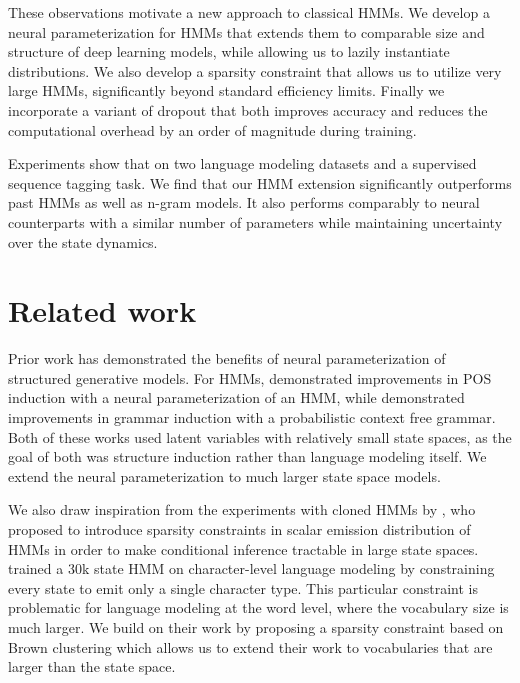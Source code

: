 \documentclass[11pt,a4paper]{article}
\begin{document}
These observations motivate a new approach to classical  HMMs.
We develop a neural parameterization for HMMs that extends 
them to comparable size and structure of deep learning models,
while allowing us to lazily instantiate distributions.
We also develop a sparsity constraint that allows us to utilize very large HMMs,
significantly beyond standard efficiency limits.
Finally we incorporate a variant of dropout that both improves accuracy
and reduces the computational overhead by an order of magnitude during training. 
    
Experiments show that on two language modeling datasets and a supervised sequence tagging task.
We find that our HMM extension significantly outperforms past HMMs as well as n-gram models. 
It also performs comparably to neural counterparts with a similar number of parameters
while maintaining uncertainty over the state dynamics.

\section{Related work}

Prior work has demonstrated the benefits of neural parameterization of structured generative models. 
For HMMs, \citet{tran2016hmm} demonstrated improvements in POS induction with a
neural parameterization of an HMM,
while \citet{kim2019cpcfg} demonstrated improvements in grammar induction with
a probabilistic context free grammar.
Both of these works used latent variables with relatively small state spaces,
as the goal of both was structure induction rather than language modeling itself.
We extend the neural parameterization to much larger state space models.

We also draw inspiration from the experiments with
cloned HMMs by \citet{dedieu2019learning},
who proposed to introduce sparsity constraints in scalar
emission distribution of HMMs in order to make conditional inference
tractable in large state spaces.
\citet{dedieu2019learning} trained a 30k state HMM on character-level language modeling
by constraining every state to emit only a single character type.
This particular constraint is problematic for language modeling at the word level,
where the vocabulary size is much larger.
We build on their work by proposing a sparsity constraint based on
Brown clustering \citep{brown1992} which allows us to extend their
work to vocabularies that are larger than the state space.
\end{document}
